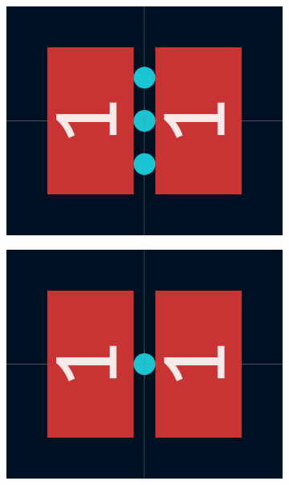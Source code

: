 \begin{figure}
    \centering
    \begin{subfigure}[b]{0.475\textwidth}
        \centering
        \includegraphics[width=\textwidth]{chapter_4/figures/SRR_CAD_hole_1.png}
        \caption{}
        \label{fig:design_1}
    \end{subfigure}
    \hfill
    \begin{subfigure}[b]{0.475\textwidth}  
        \centering 
        \includegraphics[width=\textwidth]{chapter_4/figures/SRR_CAD_hole_2.png}
        \caption{}

\end{subfigure}
\end{figure}
